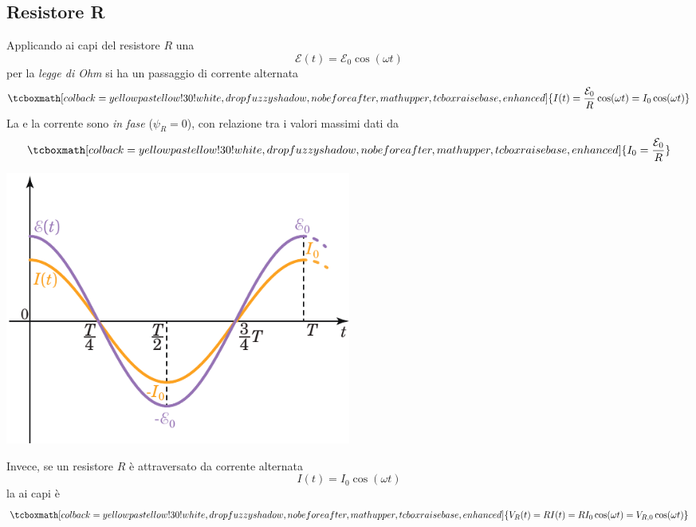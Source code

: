 \subsection{Resistore R}
	\begin{center}		
	\end{center}
Applicando ai capi del resistore $R$ una \fem
\begin{equation*}
	\mathcal{E}(t)=\mathcal{E}_0\cos(\omega t)
\end{equation*}
per la \textit{legge di Ohm} si ha un passaggio di corrente alternata
\begin{equation}
	\tcboxmath[colback=yellowpastellow!30!white,drop fuzzy shadow, nobeforeafter, math upper, tcbox raise base, enhanced]{I(t)=\frac{\mathcal{E}_0}{R}\cos(\omega t)=I_0\cos(\omega t)}
\end{equation}
La \fem e la corrente sono \textit{in fase} ($\psi_R=0$), con relazione tra i valori massimi dati da
\begin{equation}
	\tcboxmath[colback=yellowpastellow!30!white,drop fuzzy shadow, nobeforeafter, math upper, tcbox raise base, enhanced]{I_0=\frac{\mathcal{E}_0}{R}}
\end{equation}
\begin{center}
	\includegraphics[width=0.5\textwidth]{images/chp11/chp11Rsymbgraf1.pdf}
\end{center}
Invece, se un resistore $R$ è attraversato da corrente alternata 
\begin{equation*}
	I(t)=I_0\cos(\omega t)
\end{equation*}
la \ddp ai capi è
\begin{equation}
	\tcboxmath[colback=yellowpastellow!30!white,drop fuzzy shadow, nobeforeafter, math upper, tcbox raise base, enhanced]{V_R(t)=RI(t)=RI_0\cos(\omega t)=V_{R,0}\cos(\omega t)}
\end{equation}
